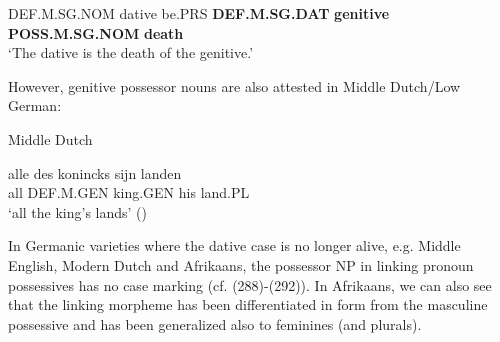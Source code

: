 DEF.M.SG.NOM  dative  be.PRS  \textbf{DEF.M.SG.DAT} \textbf{genitive} \textbf{POSS.M.SG.NOM} \textbf{death}\\

\glt  ‘The dative is the death of the genitive.’

\z

 However, genitive possessor nouns are also attested in Middle Dutch/Low German:


\item 

Middle Dutch



 \ea\label{}
\gll alle  des  konincks  sijn  landen\\


all  DEF.M.GEN  king.GEN  his  land.PL\\

\glt ‘all the king’s lands’ (\citet[58]{Norde1997})

\z

In Germanic varieties where the dative case is no longer alive, e.g. Middle English, Modern Dutch and Afrikaans, the possessor NP in linking pronoun possessives has no case marking (cf. (288){}-(292)). In Afrikaans, we can also see that the linking morpheme  has been differentiated in form from the masculine possessive  and has been generalized also to feminines (and plurals).


